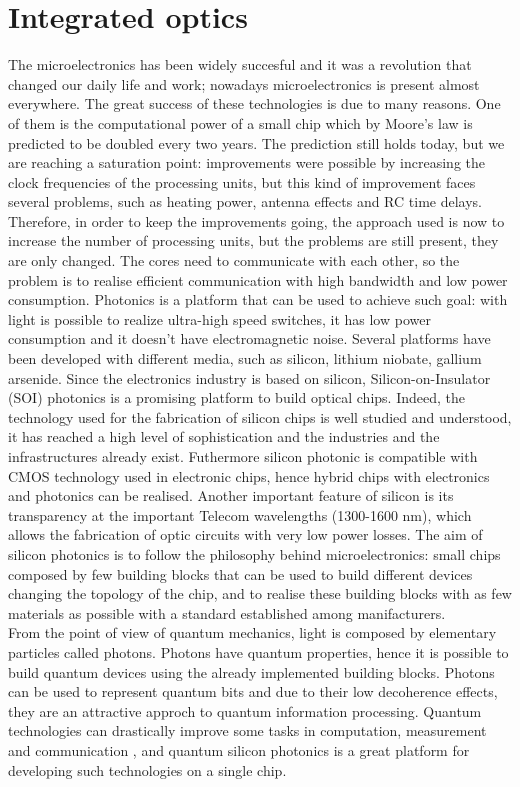 \section{Integrated optics}
The microelectronics has been widely succesful and it was a revolution that changed our daily life and work; nowadays microelectronics is present almost everywhere. The great success of these technologies is due to many reasons. One of them is the computational power of a small chip which by Moore's law is predicted to be doubled every two years. The prediction still holds today, but we are reaching a saturation point: improvements were possible by increasing the clock frequencies of the processing units, but this kind of improvement faces several problems, such as heating power, antenna effects and RC time delays. Therefore, in order to keep the improvements going, the approach used is now to increase the number of processing units, but the problems are still present, they are only changed. The cores need to communicate with each other, so the problem is to realise efficient communication with high bandwidth and low power consumption. Photonics is a platform that can be used to achieve such goal: with light is possible to realize ultra-high speed switches, it has low power consumption and it doesn't have electromagnetic noise. Several platforms have been developed with different media, such as silicon, lithium niobate, gallium arsenide. Since the electronics industry is based on silicon, Silicon-on-Insulator (SOI) photonics is a promising platform to build optical chips. Indeed, the technology used for the fabrication of silicon chips is well studied and understood, it has reached a high level of sophistication and the industries and the infrastructures already exist. Futhermore silicon photonic is compatible with CMOS technology used in electronic chips, hence hybrid chips with electronics and photonics can be realised. Another important feature of silicon is its transparency at the important Telecom wavelengths (1300-1600 nm), which allows the fabrication of optic circuits with very low power losses. The aim of silicon photonics is to follow the philosophy behind microelectronics: small chips composed by few building blocks that can be used to build different devices changing the topology of the chip, and to realise these building blocks with as few materials as possible with a standard established among manifacturers.\\
From the point of view of quantum mechanics, light is composed by elementary particles called photons. Photons have quantum properties, hence it is possible to build quantum devices using the already implemented building blocks. Photons can be used to represent quantum bits and due to their low decoherence effects, they are an attractive approch to quantum information processing. Quantum technologies can drastically improve some tasks in computation, measurement and communication , and quantum silicon photonics is a great platform for developing such technologies on a single chip. 


